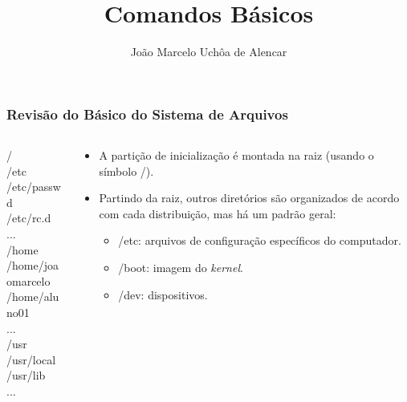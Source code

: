 \documentclass{beamer}
\title{Comandos Básicos}
\author[João Marcelo Uchôa de Alencar]{João Marcelo Uchôa de Alencar}
\institute{Universidade Federal do Ceará - Quixadá}
\begin{document}
   \begin{frame} 
      \titlepage
   \end{frame}

   \begin{frame}
      \frametitle{Revisão do Básico do Sistema de Arquivos}
      \begin{columns}
      \begin{column}{0.4\textwidth}
      / \\
      \hspace{0.5cm}/etc  \\
      \hspace{1.0cm}/etc/passwd \\
      \hspace{1.0cm}/etc/rc.d \\
      \hspace{1.0cm} ... \\
      \hspace{0.5cm}/home \\ 
      \hspace{1.0cm}/home/joaomarcelo \\ 
      \hspace{1.0cm}/home/aluno01 \\ 
      \hspace{1.0cm} ... \\
      \hspace{0.5cm}/usr \\ 
      \hspace{1.0cm}/usr/local \\ 
      \hspace{1.0cm}/usr/lib \\ 
      \hspace{1.0cm} ... \\
      \end{column}
      \begin{column}{0.6\textwidth}
      \scriptsize
      \begin{itemize}
         \item A partição de inicialização é montada na raiz (usando o símbolo /).
	 \item Partindo da raiz, outros diretórios são organizados de acordo com cada distribuição, mas há um padrão geral:
	 \begin{itemize}
           \scriptsize
	    \item /etc: arquivos de configuração específicos do computador.
	    \item /boot: imagem do \textit{kernel}.
	    \item /dev: dispositivos.

\end{itemize}
\end{itemize}
\end{column}
\end{columns}
\end{frame}
\end{document}
